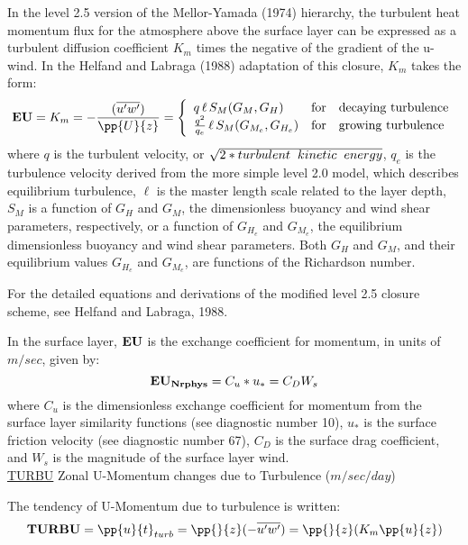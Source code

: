 \noindent  
In the level 2.5 version of the Mellor-Yamada (1974) hierarchy, the turbulent heat
momentum flux for the atmosphere above the surface layer can be expressed as a turbulent
diffusion coefficient $K_m$ times the negative of the gradient of the u-wind.
In the Helfand and Labraga (1988) adaptation of this closure, $K_m$
takes the form:
\[
{\bf EU} = K_m = -{( {\overline{u^{\prime}w^{\prime}}}) \over {\pp{U}{z}} }
 = \left\{ \begin{array}{l@{\quad\mbox{for}\quad}l} q \, \ell \, S_M(G_M,G_H) & \mbox{decaying turbulence}
\\ { q^2 \over {q_e} } \, \ell \, S_{M}(G_{M_e},G_{H_e}) & \mbox{growing turbulence} \end{array} \right.
\]
\noindent
where $q$ is the turbulent velocity, or $\sqrt{2*turbulent \hspace{.2cm} kinetic \hspace{.2cm}
energy}$, $q_e$ is the turbulence velocity derived from the more simple level 2.0 model,
which describes equilibrium turbulence, $\ell$ is the master length scale related to the layer
depth, 
$S_M$ is a function of $G_H$ and $G_M$, the dimensionless buoyancy and
wind shear parameters, respectively, or a function of $G_{H_e}$ and $G_{M_e}$, the equilibrium 
dimensionless buoyancy and wind shear
parameters.   Both $G_H$ and $G_M$, and their equilibrium values $G_{H_e}$ and $G_{M_e}$, 
are functions of the Richardson number.

\noindent
For the detailed equations and derivations of the modified level 2.5 closure scheme,
see Helfand and Labraga, 1988.
 
\noindent
In the surface layer, ${\bf {EU}}$ is the exchange coefficient for momentum,
in units of $m/sec$, given by:
\[
{\bf EU_{Nrphys}} = C_u * u_* = C_D W_s
\]
\noindent
where $C_u$ is the dimensionless exchange coefficient for momentum from the surface layer 
similarity functions (see diagnostic number 10), $u_*$ is the surface friction velocity 
(see diagnostic number 67), $C_D$ is the surface drag coefficient, and $W_s$ is the 
magnitude of the surface layer wind.
\\
 
\noindent
{ \underline {TURBU}  Zonal U-Momentum changes due to Turbulence ($m/sec/day$) }
 
\noindent
The tendency of U-Momentum due to turbulence is written:
\[
{\bf TURBU} = {\pp{u}{t}}_{turb} = {\pp{}{z} }{(- \overline{u^{\prime}w^{\prime}})}
 = {\pp{}{z} }{(K_m \pp{u}{z})}
\]

